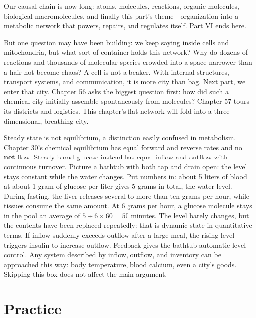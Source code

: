 Our causal chain is now long: atoms, molecules, reactions, organic molecules, biological macromolecules, and finally this part's theme---organization into a metabolic network that powers, repairs, and regulates itself. Part VI ends here.

But one question may have been building: we keep saying inside cells and mitochondria, but what sort of container holds this network? Why do dozens of reactions and thousands of molecular species crowded into a space narrower than a hair not become chaos? A cell is not a beaker. With internal structures, transport systems, and communication, it is more city than bag. Next part, we enter that city. Chapter 56 asks the biggest question first: how did such a chemical city initially assemble spontaneously from molecules? Chapter 57 tours its districts and logistics. This chapter's flat network will fold into a three-dimensional, breathing city.

\begin{tiaozhan}
Steady state is not equilibrium, a distinction easily confused in metabolism. Chapter 30's chemical equilibrium has equal forward and reverse rates and no \textbf{net} flow. Steady blood glucose instead has equal inflow and outflow with continuous turnover. Picture a bathtub with both tap and drain open: the level stays constant while the water changes. Put numbers in: about 5 liters of blood at about 1 gram of glucose per liter gives 5 grams in total, the water level. During fasting, the liver releases several to more than ten grams per hour, while tissues consume the same amount. At 6 grams per hour, a glucose molecule stays in the pool an average of $5 \div 6 \times 60 = 50$ minutes. The level barely changes, but the contents have been replaced repeatedly: that is dynamic state in quantitative terms. If inflow suddenly exceeds outflow after a large meal, the rising level triggers insulin to increase outflow. Feedback gives the bathtub automatic level control. Any system described by inflow, outflow, and inventory can be approached this way: body temperature, blood calcium, even a city's goods. Skipping this box does not affect the main argument.
\end{tiaozhan}

\section*{Practice}

